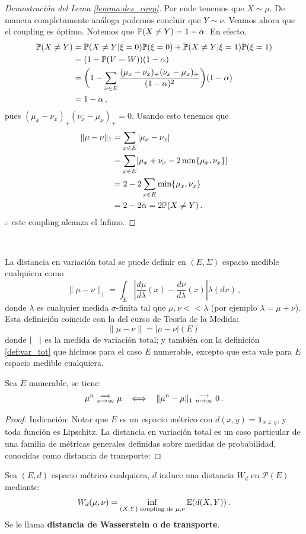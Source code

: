 \begin{proof}[Demostración del Lema \ref{lemma:des_coup}]
Por ende tenemos que $X\sim\mu$. De manera completamente análoga podemos concluir que $Y\sim\nu$.
Veamos ahora que el coupling es óptimo. Notemos que $\P(X\neq Y)=1-\alpha$. En efecto,
\begin{alignat*}{2}
    \P(X\neq Y) & = \P(X\neq Y|\xi=0)\P(\xi=0)+\P(X\neq Y|\xi=1)\P(\xi=1) \\
     & = (1-\P(V=W))(1-\alpha) \\
     & = \bigg(1-\displaystyle\sum_{x\in E}\frac{(\mu_x-\nu_x)_+(\nu_x-\mu_x)_+}{(1-\alpha)^2}\bigg)(1-\alpha) \\
     & = 1-\alpha \, ,
\end{alignat*}
pues $(\mu_x-\nu_x)_+(\nu_x-\mu_x)_+ = 0$. Usando esto tenemos que
\begin{alignat*}{2}
    \|\mu-\nu\|_1 & = \displaystyle \sum_{x\in E}|\mu_x-\nu_x| \\
     & = \displaystyle \sum_{x\in E}[\mu_x+\nu_x-2\min\{\mu_x,\nu_x\}] \\
     & = \displaystyle 2-2\sum_{x\in E}\min\{\mu_x,\nu_x\} \\
     & = 2-2\alpha = 2\P(X\neq Y) \, .
\end{alignat*}
$\therefore$ este coupling alcanza el ínfimo. \findem
\negro 
\end{proof}

\vspace{.5cm} \\
\begin{remark}
La distancia en variación total se puede definir en $(E,\Sigma)$ espacio medible cualquiera como
$$ \|\mu-\nu\|_1 = \displaystyle \int_E|\frac{d\mu}{d\lambda}(x)-\frac{d\nu}{d\lambda}(x)|\lambda(dx)\, ,$$
donde $\lambda$ es cualquier medida $\sigma$-finita tal que $\mu,\nu<<\lambda$ (por ejemplo $\lambda=\mu+\nu$).
\\ Esta definición coincide con la del curso de Teoría de la Medida:
$$ \|\mu-\nu\|=|\mu-\nu|(E) \, $$
donde $|\espacio|$ es la medida de variación total; y también con la definición \ref{def:var_tot} que hicimos para el caso $E$ numerable, excepto que esta vale para $E$ espacio medible cualquiera.
\end{remark}
\begin{proposition}%
Sea $E$ numerable, se tiene:
$$ \mu^n\convdebil\mu \espacio \Longleftrightarrow \espacio \|\mu^n-\mu\|_1\conv0\,.$$
\end{proposition}
\begin{proof}
\ejercicio \espacio \gris Indicación: Notar que $E$ es un espacio métrico con $d(x,y)=\mathbf{1}_{x\neq y}$, y toda función es Lipschitz.  La distancia en variación total es un caso particular de una familia de m\'etricas generales definidas sobre medidas de probabilidad, conocidas como distancia de transporte: 
\negro
\end{proof}
\begin{proposition}  %
Sea $(E,d)$ espacio métrico cualquiera, $d$ induce una distancia $W_d$ en $\mathcal{P}(E)$ mediante:
$$ W_d(\mu,\nu) = \displaystyle \inf_{(X,Y)\text{ coupling de }\mu,\nu}\E(d(X,Y)) \, .$$
Se le llama \textbf{distancia de Wasserstein o de transporte}.
\end{proposition}

